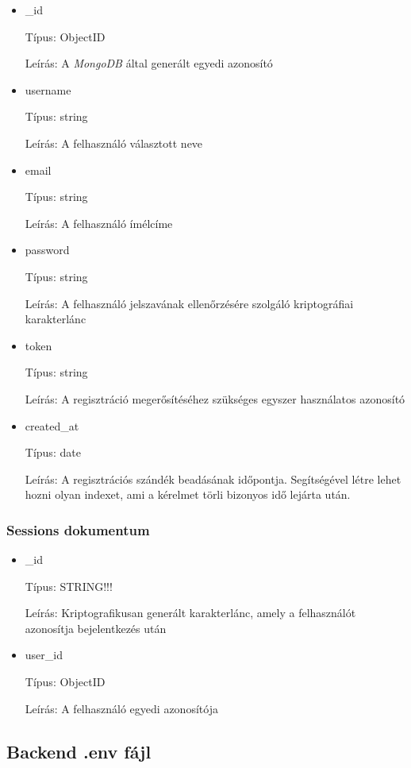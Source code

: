 \begin{itemize}
      \item \_id

            Típus: ObjectID

            Leírás: A \emph{MongoDB} által generált egyedi azonosító
      \item username

            Típus: string

            Leírás: A felhasználó választott neve
      \item email

            Típus: string

            Leírás: A felhasználó ímélcíme
      \item password

            Típus: string

            Leírás: A felhasználó jelszavának ellenőrzésére szolgáló kriptográfiai karakterlánc
      \item token

            Típus: string

            Leírás: A regisztráció megerősítéséhez szükséges egyszer használatos azonosító
      \item created\_at

            Típus: date

            Leírás: A regisztrációs szándék beadásának időpontja. Segítségével létre lehet hozni olyan indexet, ami a kérelmet törli bizonyos idő lejárta után.
\end{itemize}
\subsubsection{Sessions dokumentum}

\begin{itemize}
      \item \_id

            Típus: STRING!!!

            Leírás: Kriptografikusan generált karakterlánc, amely a felhasználót azonosítja bejelentkezés után
      \item user\_id

            Típus: ObjectID

            Leírás: A felhasználó egyedi azonosítója
\end{itemize}


\subsection{Backend .env fájl}

